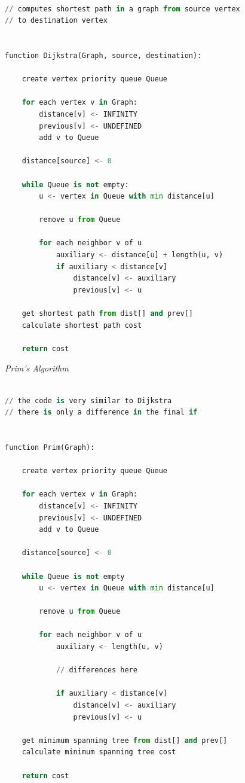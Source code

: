 \documentclass[12pt, a4paper]{article}
\begin{document}
\normalsize
\begin{lstlisting}[language=Python]

// computes shortest path in a graph from source vertex
// to destination vertex


function Dijkstra(Graph, source, destination):

    create vertex priority queue Queue

    for each vertex v in Graph:              
        distance[v] <- INFINITY                  
        previous[v] <- UNDEFINED                 
        add v to Queue                       

    distance[source] <- 0                         
    
    while Queue is not empty:
        u <- vertex in Queue with min distance[u]    
                                         
        remove u from Queue 
        
        for each neighbor v of u       
            auxiliary <- distance[u] + length(u, v)
            if auxiliary < distance[v]           
                distance[v] <- auxiliary
                previous[v] <- u 

    get shortest path from dist[] and prev[]
    calculate shortest path cost
    
    return cost
\end{lstlisting}

\newpage

\centering
\large
\textit{Prim's Algorithm}
\vspace{10mm}

\normalsize
\begin{lstlisting}[language=Python]

// the code is very similar to Dijkstra
// there is only a difference in the final if


function Prim(Graph):
    
    create vertex priority queue Queue

    for each vertex v in Graph:              
        distance[v] <- INFINITY                  
        previous[v] <- UNDEFINED                 
        add v to Queue                       

    distance[source] <- 0                         
    
    while Queue is not empty
        u <- vertex in Queue with min distance[u]    
                                         
        remove u from Queue 
        
        for each neighbor v of u       
            auxiliary <- length(u, v)
            
            // differences here
            
            if auxiliary < distance[v]           
                distance[v] <- auxiliary 
                previous[v] <- u 
    
    get minimum spanning tree from dist[] and prev[]
    calculate minimum spanning tree cost
    
    return cost
    
\end{lstlisting}
\end{document}
